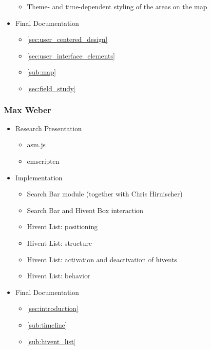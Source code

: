 \begin{itemize}
\begin{itemize}
    \item Theme- and time-dependent styling of the areas on the map
  \end{itemize}
  \item Final Documentation
  \begin{itemize}
    \item \ref{sec:user_centered_design} 
    \item \ref{sec:user_interface_elements} 
    \item \ref{sub:map} 
    \item \ref{sec:field_study} 
  \end{itemize}
\end{itemize}


\subsubsection{Max Weber} %
\label{ssub:max_weber}

\begin{itemize}
  \item Research Presentation
  \begin{itemize}
    \item asm.js
    \item emscripten
  \end{itemize}
  \item Implementation
  \begin{itemize}
    \item Search Bar module (together with Chris Hirnischer)
    \item Search Bar and Hivent Box interaction
    \item Hivent List: positioning
    \item Hivent List: structure
    \item Hivent List: activation and deactivation of hivents
    \item Hivent List: behavior
  \end{itemize}
  \item Final Documentation
  \begin{itemize}
    \item \ref{sec:introduction} 
    \item \ref{sub:timeline} 
    \item \ref{sub:hivent_list} 
  \end{itemize}
\end{itemize}

